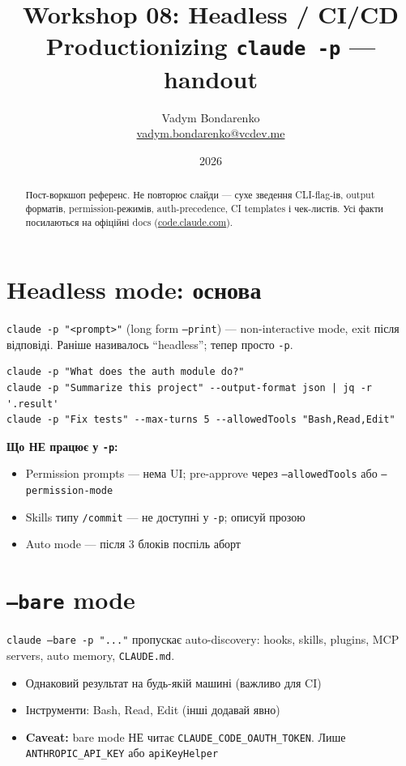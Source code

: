 \documentclass[11pt,a4paper]{article}
\title{%
  {\Huge\bfseries Workshop 08: Headless / CI/CD}\\[0.6em]
  {\large Productionizing \texttt{claude -p} --- handout}
}
\author{Vadym Bondarenko \\ \small\href{mailto:vadym.bondarenko@vcdev.me}{vadym.bondarenko@vcdev.me}}
\date{2026}
\begin{document}
\maketitle

\begin{abstract}
Пост-воркшоп референс. Не повторює слайди --- сухе зведення CLI-flag-ів, output форматів, permission-режимів, auth-precedence, CI templates і чек-листів. Усі факти посилаються на офіційні docs (\href{https://code.claude.com/docs/en/headless}{code.claude.com}).
\end{abstract}

\tableofcontents
\newpage

\section{Headless mode: основа}

\texttt{claude -p "<prompt>"} (long form \texttt{--print}) --- non-interactive mode, exit після відповіді. Раніше називалось ``headless''; тепер просто \texttt{-p}.

\begin{lstlisting}
claude -p "What does the auth module do?"
claude -p "Summarize this project" --output-format json | jq -r '.result'
claude -p "Fix tests" --max-turns 5 --allowedTools "Bash,Read,Edit"
\end{lstlisting}

\textbf{Що НЕ працює у \texttt{-p}:}
\begin{itemize}[leftmargin=2em]
\item Permission prompts --- нема UI; pre-approve через \texttt{--allowedTools} або \texttt{--permission-mode}
\item Skills типу \texttt{/commit} --- не доступні у \texttt{-p}; описуй прозою
\item Auto mode --- після 3 блоків поспіль аборт
\end{itemize}

\section{\texttt{--bare} mode}

\texttt{claude --bare -p "..."} пропускає auto-discovery: hooks, skills, plugins, MCP servers, auto memory, \texttt{CLAUDE.md}.

\begin{itemize}[leftmargin=2em]
\item Однаковий результат на будь-якій машині (важливо для CI)
\item Інструменти: Bash, Read, Edit (інші додавай явно)
\item \textbf{Caveat:} bare mode НЕ читає \texttt{CLAUDE\_CODE\_OAUTH\_TOKEN}. Лише \texttt{ANTHROPIC\_API\_KEY} або \texttt{apiKeyHelper}
\end{itemize}
\end{document}
